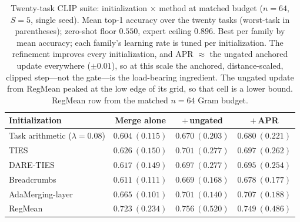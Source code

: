\documentclass[11pt]{article}
\begin{document}
\begin{table}[t]
\centering
\small
\setlength{\tabcolsep}{4pt}
\caption{Twenty-task CLIP suite: initialization $\times$ method at matched budget ($n=64$, $S=5$, single seed). Mean top-1 accuracy over the twenty tasks (worst-task in parentheses); zero-shot floor $0.550$, expert ceiling $0.896$. Best per family by mean accuracy; each family's learning rate is tuned per initialization. The refinement improves every initialization, and APR $\approx$ the ungated anchored update everywhere ($\pm0.01$), so at this scale the anchored, distance-scaled, clipped step---not the gate---is the load-bearing ingredient. The ungated update from RegMean peaked at the low edge of its grid, so that cell is a lower bound. RegMean row from the matched $n=64$ Gram budget.}
\label{tab:clip20matrix}
\begin{tabular}{lccc}
\toprule
Initialization & Merge alone & $+$\,ungated & $+$\,APR \\
\midrule
Task arithmetic ($\lambda=0.08$) & $0.604\ (0.115)$ & $0.670\ (0.203)$ & $\mathbf{0.680}\ (0.221)$ \\
TIES                             & $0.626\ (0.150)$ & $\mathbf{0.701}\ (0.277)$ & $0.697\ (0.262)$ \\
DARE-TIES                        & $0.617\ (0.149)$ & $\mathbf{0.697}\ (0.277)$ & $0.695\ (0.254)$ \\
Breadcrumbs                      & $0.611\ (0.111)$ & $0.669\ (0.168)$ & $\mathbf{0.678}\ (0.177)$ \\
AdaMerging-layer                 & $0.665\ (0.101)$ & $0.701\ (0.140)$ & $\mathbf{0.707}\ (0.188)$ \\
RegMean                          & $0.723\ (0.234)$ & $0.756\ (0.520)$ & $0.749\ (0.486)$ \\
\bottomrule
\end{tabular}
\end{table}
\end{document}
